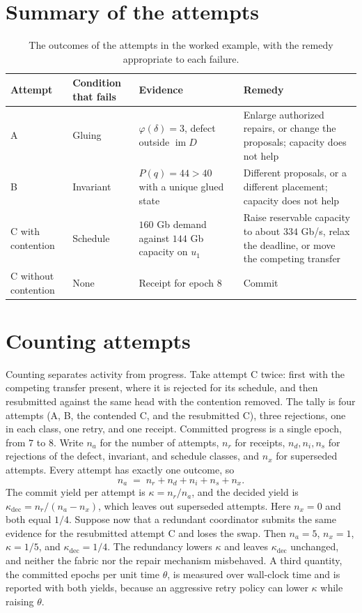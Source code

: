 \documentclass[11pt,openany]{book}
\theoremstyle{remark}
\begin{document}
\section{Summary of the attempts}

\begin{table}[H]
\centering
\begin{tabular}{@{}P{0.12\textwidth}P{0.2\textwidth}P{0.24\textwidth}P{0.34\textwidth}@{}}
\toprule
Attempt & Condition that fails & Evidence & Remedy \\
\midrule
A & Gluing & $\varphi(\delta)=3$, defect outside $\operatorname{im}D$ & Enlarge authorized repairs, or change the proposals; capacity does not help \\
B & Invariant & $P(q)=44>40$ with a unique glued state & Different proposals, or a different placement; capacity does not help \\
C with contention & Schedule & $160$ Gb demand against $144$ Gb capacity on $u_1$ & Raise reservable capacity to about $334$ Gb/s, relax the deadline, or move the competing transfer \\
C without contention & None & Receipt for epoch $8$ & Commit \\
\bottomrule
\end{tabular}
\caption{The outcomes of the attempts in the worked example, with the remedy appropriate to each failure.}\label{tab:attempts}
\end{table}

\section{Counting attempts}

Counting separates activity from progress. Take attempt C twice: first with the competing transfer present, where it is rejected for its schedule, and then resubmitted against the same head with the contention removed. The tally is four attempts (A, B, the contended C, and the resubmitted C), three rejections, one in each class, one retry, and one receipt. Committed progress is a single epoch, from $7$ to $8$. Write $n_a$ for the number of attempts, $n_r$ for receipts, $n_d,n_i,n_s$ for rejections of the defect, invariant, and schedule classes, and $n_x$ for superseded attempts. Every attempt has exactly one outcome, so
\[
n_a\;=\;n_r+n_d+n_i+n_s+n_x .
\]
The commit yield per attempt is $\kappa=n_r/n_a$, and the decided yield is $\kappa_{\mathrm{dec}}=n_r/(n_a-n_x)$, which leaves out superseded attempts. Here $n_x=0$ and both equal $1/4$. Suppose now that a redundant coordinator submits the same evidence for the resubmitted attempt C and loses the swap. Then $n_a=5$, $n_x=1$, $\kappa=1/5$, and $\kappa_{\mathrm{dec}}=1/4$. The redundancy lowers $\kappa$ and leaves $\kappa_{\mathrm{dec}}$ unchanged, and neither the fabric nor the repair mechanism misbehaved. A third quantity, the committed epochs per unit time $\theta$, is measured over wall-clock time and is reported with both yields, because an aggressive retry policy can lower $\kappa$ while raising $\theta$.
\end{document}
